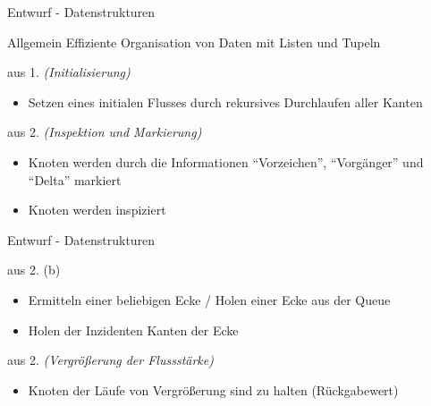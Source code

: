 \documentclass{beamer}
\begin{document}
    \begin{frame}{Entwurf - Datenstrukturen}
        \begin{block}{Allgemein}
            Effiziente Organisation von Daten mit Listen und Tupeln
        \end{block}
        \begin{block}{aus 1. \textit{(Initialisierung)}}
            \begin{itemize}
                \item Setzen eines initialen Flusses durch rekursives Durchlaufen aller Kanten
            \end{itemize}
        \end{block}
        \begin{block}{aus 2. \textit{(Inspektion und Markierung)}}
            \begin{itemize}
                \item Knoten werden durch die Informationen "`Vorzeichen"', "`Vorg\"anger"' und "`Delta"' markiert
                \item Knoten werden inspiziert
            \end{itemize}
        \end{block}
    \end{frame}

    \begin{frame}{Entwurf - Datenstrukturen}
        \begin{block}{aus 2. (b)}
            \begin{itemize}
                \item Ermitteln einer beliebigen Ecke / Holen einer Ecke aus der Queue
                \item Holen der Inzidenten Kanten der Ecke
            \end{itemize}
        \end{block}

        \begin{block}{aus 2. \textit{(Vergr\"o\ss{}erung der Flussst\"arke)}}
            \begin{itemize}
                \item Knoten der L\"aufe von Vergr\"o\ss{}erung sind zu halten (R\"uckgabewert)
            \end{itemize}
        \end{block}
    \end{frame}
\end{document}
